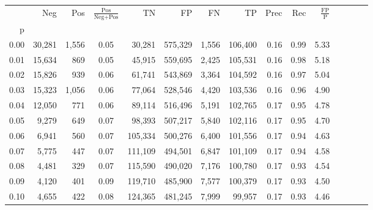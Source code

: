 \begin{tabular}{rrrcrrrrrrrrrrr}
\toprule
{} &     Neg &    Pos & $\frac{\text{Pos}}{\text{Neg}+\text{Pos}}$ &       TN &       FP &       FN &       TP &  Prec &   Rec & $\frac{\text{FP}}{\text{P}}$ \\
p    &         &        &                                            &          &          &          &          &       &       &                              \\
\midrule
0.00 &  30,281 &  1,556 &                                       0.05 &   30,281 &  575,329 &    1,556 &  106,400 &  0.16 &  0.99 &                         5.33 \\
0.01 &  15,634 &    869 &                                       0.05 &   45,915 &  559,695 &    2,425 &  105,531 &  0.16 &  0.98 &                         5.18 \\
0.02 &  15,826 &    939 &                                       0.06 &   61,741 &  543,869 &    3,364 &  104,592 &  0.16 &  0.97 &                         5.04 \\
0.03 &  15,323 &  1,056 &                                       0.06 &   77,064 &  528,546 &    4,420 &  103,536 &  0.16 &  0.96 &                         4.90 \\
0.04 &  12,050 &    771 &                                       0.06 &   89,114 &  516,496 &    5,191 &  102,765 &  0.17 &  0.95 &                         4.78 \\
0.05 &   9,279 &    649 &                                       0.07 &   98,393 &  507,217 &    5,840 &  102,116 &  0.17 &  0.95 &                         4.70 \\
0.06 &   6,941 &    560 &                                       0.07 &  105,334 &  500,276 &    6,400 &  101,556 &  0.17 &  0.94 &                         4.63 \\
0.07 &   5,775 &    447 &                                       0.07 &  111,109 &  494,501 &    6,847 &  101,109 &  0.17 &  0.94 &                         4.58 \\
0.08 &   4,481 &    329 &                                       0.07 &  115,590 &  490,020 &    7,176 &  100,780 &  0.17 &  0.93 &                         4.54 \\
0.09 &   4,120 &    401 &                                       0.09 &  119,710 &  485,900 &    7,577 &  100,379 &  0.17 &  0.93 &                         4.50 \\
0.10 &   4,655 &    422 &                                       0.08 &  124,365 &  481,245 &    7,999 &   99,957 &  0.17 &  0.93 &                         4.46 \\

\end{tabular}
